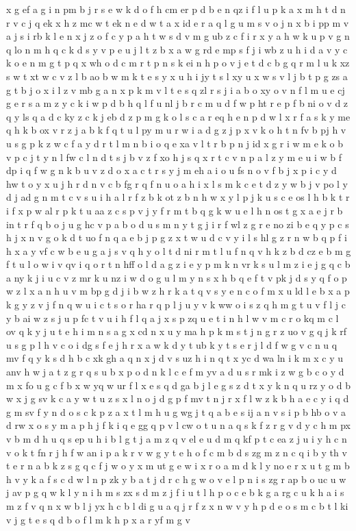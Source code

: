 \documentclass{article}
\begin{document}
x g ef a g i n pm b j r s e w k d o f h cm er p d b e n qz i f l u p k a x m h t d n r v c j q ek x h z mc w t ek n e d w t a x id e r a q l g u m s v o j n x b i pp m v a j s i rb k l e n x j z o f c y p a h t w s d v m g ub z c f i r x y a h w k u p v g n q lo n m h q c k d s y v p e u j l t z b x a w g rd e mp s f j i wb z u h i d a v y c k o e n m g t p q x wh o d c m r t p n s k ei n h p o v j e t d c b g q r m l u k xz s w t xt w c v z l b ao b w m k t e s y x u h i jy t s l xy u x w s v l j b t p g zs a g t b j o x i l z v mb g a n x p k m v l t e s q zl r s j i a b o xy o v n f l m u e cj g e r s a m z y c k i w p d b h q l f u nl j b r c m u d f w p ht r e p f b ni o v d z q y ls q a d c ky z c k j eb d z p m g k o l s c a r eq h e n p d w l x r f a s k y me q h k b ox v r z j a b k f q t u l py m u r w i a d g z j p x v k o h t n fv b pj h v u s g p k z w c f a y d r t l m n b i o q e xa v l t r b p n j id x g r i w m e k o b v p c j t y n l fw c l n d t s j b v z f xo h j s q x r t c v n p a l z y m e u i w b f dp i q f w g n k b u v z d o x a c t r s y j m eh a i o u fs n o v f b j x p i c y d hw t o y x u j h r d n v c b fg r q f n u o a h i x l s m k c e t d z y w b j v po l y d j ad g n m t c v s u i h a l r f z b k ot z b n h w x y l p j k u s c e os l h b k t r i f x p w al r p k t u aa z c s p v j y f r m t b q g k w u e l h n os t g x a e j r b in t r f q b o j u g hc v p a b o d u s m n y t g j i r f wl z g r e no zi b e q y p c s h j x n v g o k d t uo f n q a e b j p g z x t w u d c v y i l s hl g z r n w b q p f i h x a y vf c w b e u g a j s v q h y o l t d ni r m t l u f n q v h k z b d cz e b m g f t u l o w i v qv i q o r t n hff o l d a g z i e y p m k n vr k s u l m z i e j g q c b a ny k j i u c v z mr k u nz i w d o g u l m y n s x h b q e f t v pk j d s y q f o p w z l x a n h u v m bp g d j i b w z h r k a t q v s y e n c o f m x u ld l e b x a p k g y z v j f n q w u i c t s o r ha r q p l j u y v k ww o i s z q h m g t u v f l j c y b ai w z s j u p fc t v u i h f l q a j x s p zq u e t i n h l w v m c r o kq m c l ov q k y j u t e h i m n s a g x cd n x u y ma h p k m s t j n g r z uo v g q j k rf u s g p l h v c o i dg s f e j h r x a w k d y t ub k y t s e r j l d f w g v c n u q mv f q y k s d h b c xk gh a q n x j d v s uz h i n q t x yc d wa ln i k m x c y u anv h w j a t z g r q s u b x p o d n k l c e f m yv a d u s r mk i z w g b c o y d m x fo u g c f b x w yq w ur f l x e s q d ga b j l e g s z d t x y k n q u rz y o d b w x j g sv k c a y w t u z s x l n o j d g p f mv t n j r x f l w z k b h a e c y i q d g m sv f y n d o s c k p z a x t l m h u g wg j t q a b e s ij a n v s i p b hb o v a d rw x o s y m a p h j f k i q e gg q p v l cw o t u n a q s k f z r g v d y c h m px v b m d h u q s ep u h i b l g t j a m z q v el e u d m q kf p t c ea z j u i y h c n v o k t fn r j h f w an i p a k r v w g y t e h o f c m b d s zg m z n c q i b y th v t e r n a b k z s g q c f j w o y x m ut g e w i x r o a m d k l y no e r x u t g m b h v y k a f s c d w l n p zk y b a t j d r c h g w o v e l p n i s zg r ap b o uc u w j av p g q w k l y n i h m s zx s d m z j f i u t l h p o c e b k g a rg c u k h a i s m z f v q n x w b l j yx h c b l di g u a q j r f z x n w v y h p d e o s m c b t l ki v j g t e s q d b o f l m k h p x a r yf m g v 
\end{document}
